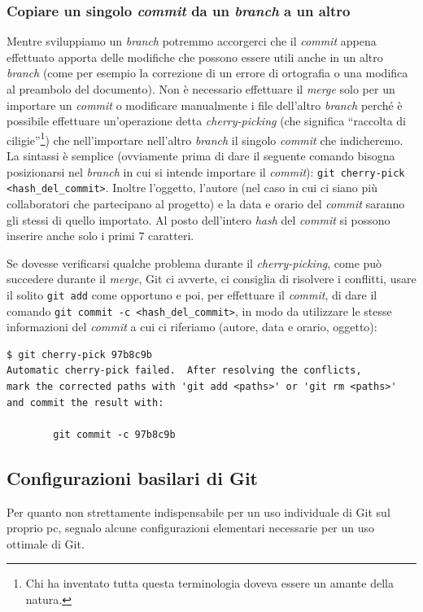 \documentclass[a4paper,12pt,oneside]{article}
\begin{document}
\subsubsection{Copiare un singolo \emph{commit} da un \emph{branch} a un altro}
Mentre sviluppiamo un \emph{branch} potremmo accorgerci che il \emph{commit} appena
effettuato apporta delle modifiche che possono essere utili anche in un altro
\emph{branch} (come per esempio la correzione di un errore di ortografia o una
modifica al preambolo del documento). Non è necessario effettuare il \emph{merge}
solo per un importare un \emph{commit} o modificare manualmente i file dell'altro
\emph{branch} perché è possibile effettuare un'operazione detta
\emph{cherry-picking} (che significa ``raccolta di ciligie''\footnote{Chi ha
  inventato tutta questa terminologia doveva essere un amante della natura.}) che
nell'importare nell'altro \emph{branch} il singolo \emph{commit} che
indicheremo. La sintassi è semplice (ovviamente prima di dare il seguente comando
bisogna posizionarsi nel \emph{branch} in cui si intende importare il \emph{commit}):
\lstinline|git cherry-pick <hash_del_commit>|. Inoltre l'oggetto, l'autore (nel
caso in cui ci siano più collaboratori che partecipano al progetto) e la data e
orario del \emph{commit} saranno gli stessi di quello importato. Al posto
dell'intero \emph{hash} del \emph{commit} si possono inserire anche solo i primi
$7$ caratteri.

Se dovesse verificarsi qualche problema durante il \emph{cherry-picking}, come
può succedere durante il \emph{merge}, Git ci avverte, ci consiglia di risolvere
i conflitti, usare il solito \lstinline|git add| come opportuno e poi, per
effettuare il \emph{commit}, di dare il comando
\lstinline|git commit -c <hash_del_commit>|, in modo da utilizzare le stesse
informazioni del \emph{commit} a cui ci riferiamo (autore, data e orario,
oggetto):
\begin{lstlisting}[language={},emph={}]
$ git cherry-pick 97b8c9b
Automatic cherry-pick failed.  After resolving the conflicts,
mark the corrected paths with 'git add <paths>' or 'git rm <paths>'
and commit the result with:

        git commit -c 97b8c9b
\end{lstlisting}

\subsection{Configurazioni basilari di Git}
Per quanto non strettamente indispensabile per un uso individuale di Git sul
proprio pc, segnalo alcune configurazioni elementari necessarie per un uso
ottimale di Git.
\end{document}
